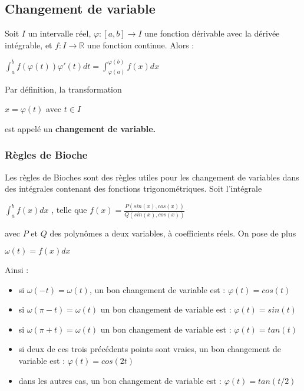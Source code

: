 \documentclass[12pt, a4paper]{book}
\begin{document}
\subsection{Changement de variable}
Soit $I$ un intervalle réel, $\varphi : [a,b] \rightarrow I$ une fonction dérivable avec la dérivée intégrable, et $f: I \rightarrow \mathbb{R}$ une fonction continue. Alors :
\ \\
\begin{center}
    $\int_{a}^{b} f(\varphi(t))\varphi'(t)dt = \int_{\varphi(a)}^{\varphi(b)} f(x) dx$\\
\end{center}
Par définition, la transformation
\begin{center}
    $x = \varphi(t) $ avec $ t\in I$
\end{center}
est appelé un \textbf{changement de variable.}
\subsubsection{Règles de Bioche}
Les règles de Bioches sont des règles utiles pour les changement de variables dans des intégrales contenant des fonctions trigonométriques.
Soit l'intégrale 
\begin{center}
    $\int_{a}^{b} f(x) dx$ , telle que $f(x)=\frac{P(sin(x),cos(x))}{Q(sin(x),cos(x))}$
\end{center} avec $P$ et $Q$ des polynômes a deux variables, à coefficients réels.
On pose de plus 
\begin{center}
    $\omega(t) = f(x)dx$
\end{center}
Ainsi :
\begin{itemize}
    \item si $\omega(-t) = \omega(t)$, un bon changement de variable est : $\varphi(t)=cos(t)$ 
    \item si $\omega(\pi-t) = \omega(t)$ un bon changement de variable est : $\varphi(t)=sin(t)$
    \item si $\omega(\pi+t) = \omega(t)$ un bon changement de variable est : $\varphi(t)=tan(t)$
    \item si deux de ces trois précédents points sont vraies,  un bon changement de variable est : $\varphi(t)=cos(2t)$
    \item dans les autres cas,  un bon changement de variable est : $\varphi(t)=tan(t/2)$
\end{itemize}

\newpage
\end{document}
